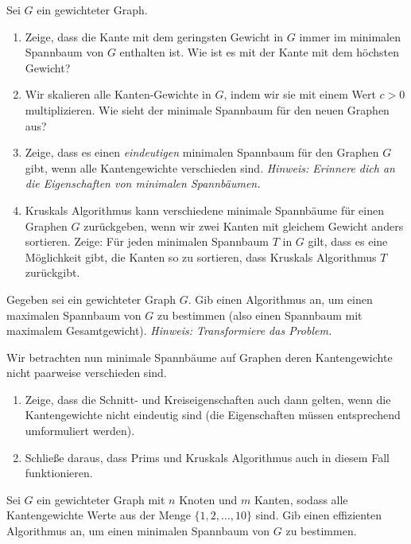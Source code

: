 \documentclass{uebung_cs}
\begin{document}
\begin{aufgabe}
	Sei $G$ ein gewichteter Graph.
	\begin{enumerate}
		\item Zeige, dass die Kante mit dem geringsten Gewicht in $G$ immer im minimalen Spannbaum von $G$ enthalten ist.
		Wie ist es mit der Kante mit dem höchsten Gewicht? 
		\item Wir skalieren alle Kanten-Gewichte in $G$, indem wir sie mit einem Wert $c>0$ multiplizieren.
		Wie sieht der minimale Spannbaum für den neuen Graphen aus?
		\item Zeige, dass es einen \emph{eindeutigen} minimalen Spannbaum für den Graphen $G$ gibt, wenn alle Kantengewichte verschieden sind.
		\textit{Hinweis: Erinnere dich an die Eigenschaften von minimalen Spannbäumen.}
		\item Kruskals Algorithmus kann verschiedene minimale Spannbäume für einen Graphen $G$ zurückgeben, wenn wir zwei Kanten mit gleichem Gewicht anders sortieren.
		Zeige: Für jeden minimalen Spannbaum $T$ in $G$ gilt, dass es eine Möglichkeit gibt, die Kanten so zu sortieren, dass Kruskals Algorithmus $T$ zurückgibt.
	\end{enumerate}
\end{aufgabe}


\begin{aufgabe}
	Gegeben sei ein gewichteter Graph $G$. Gib einen Algorithmus an, um einen maximalen Spannbaum von $G$ zu bestimmen (also einen Spannbaum mit maximalem Gesamtgewicht).
	\emph{Hinweis: Transformiere das Problem.}
\end{aufgabe}


\begin{aufgabe}
	Wir betrachten nun minimale Spannbäume auf Graphen deren Kantengewichte nicht paarweise verschieden sind.
	\begin{enumerate}
		\item Zeige, dass die Schnitt- und Kreiseigenschaften auch dann gelten, wenn die Kantengewichte nicht eindeutig sind (die Eigenschaften müssen entsprechend umformuliert werden).
		\item Schließe daraus, dass Prims und Kruskals Algorithmus auch in diesem Fall funktionieren.
	\end{enumerate}
\end{aufgabe}

\begin{aufgabe}%
	Sei $G$ ein gewichteter Graph mit $n$ Knoten und $m$ Kanten, sodass alle Kantengewichte Werte aus der Menge $\{ 1, 2, \ldots , 10\}$ sind.
	Gib einen effizienten Algorithmus an, um einen minimalen Spannbaum von $G$ zu bestimmen.
\end{aufgabe}
\end{document}
